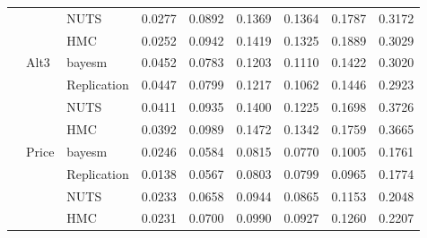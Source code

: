\begin{tabular}{lllcccccc}
 &  & NUTS & 0.0277 & 0.0892 & 0.1369 & 0.1364 & 0.1787 & 0.3172 \\
 &  & HMC & 0.0252 & 0.0942 & 0.1419 & 0.1325 & 0.1889 & 0.3029 \\
 & Alt3 & bayesm & 0.0452 & 0.0783 & 0.1203 & 0.1110 & 0.1422 & 0.3020 \\
 &  & Replication & 0.0447 & 0.0799 & 0.1217 & 0.1062 & 0.1446 & 0.2923 \\
 &  & NUTS & 0.0411 & 0.0935 & 0.1400 & 0.1225 & 0.1698 & 0.3726 \\
 &  & HMC & 0.0392 & 0.0989 & 0.1472 & 0.1342 & 0.1759 & 0.3665 \\
 & Price & bayesm & 0.0246 & 0.0584 & 0.0815 & 0.0770 & 0.1005 & 0.1761 \\
 &  & Replication & 0.0138 & 0.0567 & 0.0803 & 0.0799 & 0.0965 & 0.1774 \\
 &  & NUTS & 0.0233 & 0.0658 & 0.0944 & 0.0865 & 0.1153 & 0.2048 \\
 &  & HMC & 0.0231 & 0.0700 & 0.0990 & 0.0927 & 0.1260 & 0.2207 \\
\bottomrule
\end{tabular}
